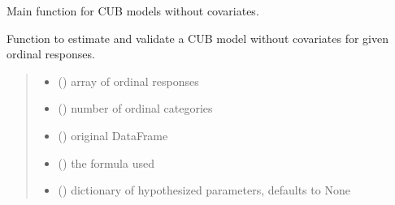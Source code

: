 \documentclass[letterpaper,10pt,english]{sphinxmanual}
\begin{document}
\begin{fulllineitems}
\label{\detokenize{cubmods:cubmods.cub.mle}}
\pysigstartsignatures
{}
\pysigstopsignatures
\sphinxAtStartPar
Main function for CUB models without covariates.

\sphinxAtStartPar
Function to estimate and validate a CUB model without covariates for given ordinal responses.
\begin{quote}\begin{description}
\begin{itemize}
\item {} 
\sphinxAtStartPar
{} () \textendash{} array of ordinal responses

\item {} 
\sphinxAtStartPar
{} () \textendash{} number of ordinal categories

\item {} 
\sphinxAtStartPar
{} () \textendash{} original DataFrame

\item {} 
\sphinxAtStartPar
{} () \textendash{} the formula used

\item {} 
\sphinxAtStartPar
{} (\sphinxstyleliteralemphasis{\sphinxupquote{, }}) \textendash{} dictionary of hypothesized parameters, defaults to None


\end{itemize}
\end{description}
\end{quote}
\end{fulllineitems}
\end{document}
